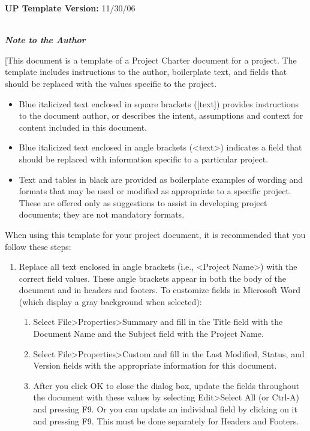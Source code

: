 \textbf{UP Template Version:} 11/30/06

\emph{\textbf{\\
Note to the Author}}

{[}This document is a template of a Project Charter document for a
project. The template includes instructions to the author, boilerplate
text, and fields that should be replaced with the values specific to the
project.

\begin{itemize}
\item
  Blue italicized text enclosed in square brackets ({[}text{]}) provides
  instructions to the document author, or describes the intent,
  assumptions and context for content included in this document.
\item
  Blue italicized text enclosed in angle brackets
  (\textless{}text\textgreater{}) indicates a field that should be
  replaced with information specific to a particular project.
\item
  Text and tables in black are provided as boilerplate examples of
  wording and formats that may be used or modified as appropriate to a
  specific project. These are offered only as suggestions to assist in
  developing project documents; they are not mandatory formats.
\end{itemize}

When using this template for your project document, it is recommended
that you follow these steps:

\begin{enumerate}
\def\labelenumi{\arabic{enumi}.}
\item
  Replace all text enclosed in angle brackets (i.e., \textless{}Project
  Name\textgreater{}) with the correct field values. These angle
  brackets appear in both the body of the document and in headers and
  footers. To customize fields in Microsoft Word (which display a gray
  background when selected):

  \begin{enumerate}
  \def\labelenumii{\alph{enumii}.}
  \item
    Select File\textgreater{}Properties\textgreater{}Summary and fill in
    the Title field with the Document Name and the Subject field with
    the Project Name.
  \item
    Select File\textgreater{}Properties\textgreater{}Custom and fill in
    the Last Modified, Status, and Version fields with the appropriate
    information for this document.
  \item
    After you click OK to close the dialog box, update the fields
    throughout the document with these values by selecting
    Edit\textgreater{}Select All (or Ctrl-A) and pressing F9. Or you can
    update an individual field by clicking on it and pressing F9. This
    must be done separately for Headers and Footers.
  \end{enumerate}
\end{enumerate}

